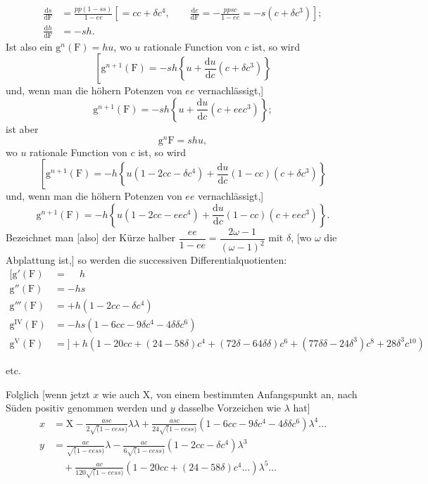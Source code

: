 \[
\begin{aligned}
\frac{\mathrm ds}{\mathrm d\mathrm F}
 &=\frac{pp(1-ss)}{1-ee}\left[=cc+\delta c^4,\qquad
 \frac{\mathrm dc}{\mathrm d\mathrm F}=-\frac{ppsc}{1-ee}=-s(c+\delta c^3)\right];\\
\frac{\mathrm dh}{\mathrm d\mathrm F}&=-sh.
\end{aligned}
\]
Ist also ein \(\mathrm g^n(\mathrm F)=hu\), wo \(u\) rationale Function von \(c\) ist, so wird
\[
\left[\mathrm g^{n+1}(\mathrm F)=-sh\left\{u+\frac{\mathrm du}{\mathrm dc}(c+\delta c^3)\right\}\right.
\]
\noindent und, wenn man die höhern Potenzen von \(ee\) vernachlässigt,]
\[
\mathrm g^{n+1}(\mathrm F)=-sh\left\{u+\frac{\mathrm du}{\mathrm dc}(c+eec^3)\right\};
\]
\noindent ist aber
\[
\mathrm g^n\mathrm F=shu,
\]
\noindent wo \(u\) rationale Function von \(c\) ist, so wird
\[
\left[\mathrm g^{n+1}(\mathrm F)=-h\left\{u(1-2cc-\delta c^4)
 +\frac{\mathrm du}{\mathrm dc}(1-cc)(c+\delta c^3)\right\}\right.
\]
\noindent und, wenn man die höhern Potenzen von \(ee\) vernachlässigt,]
\[
\mathrm g^{n+1}(\mathrm F)=-h\left\{u(1-2cc-eec^4)
 +\frac{\mathrm du}{\mathrm dc}(1-cc)(c+eec^3)\right\}.
\]
Bezeichnet man [also] der Kürze halber
\(\dfrac{ee}{1-ee}=\dfrac{2\omega-1}{(\omega-1)^2}\) mit \(\delta\),
[wo \(\omega\) die Abplattung ist,] so werden die successiven Differentialquotienten:
\[
\begin{aligned}
\mathopen{[}\mathrm g'(\mathrm F)&=\phantom{+}h\\
\mathrm g''(\mathrm F)&=-hs\\
\mathrm g'''(\mathrm F)&=+h(1-2cc-\delta c^4)\\
\mathrm g^{\mathrm{IV}}(\mathrm F)&=-hs(1-6cc-9\delta c^4-4\delta\delta c^6)\\
\mathrm g^{\mathrm V}(\mathrm F)&={]}+h(1-20cc+(24-58\delta)c^4+(72\delta-64\delta\delta)c^6
 +(77\delta\delta-24\delta^3)c^8+28\delta^3c^{10})
\end{aligned}
\]
\centerline{etc.}
\medskip

Folglich [wenn jetzt \(x\) wie auch \(\mathrm X\), von einem bestimmten Anfangspunkt
an, nach Süden positiv genommen werden und \(y\) dasselbe Vorzeichen wie \(\lambda\) hat]
\[
\begin{aligned}
x&=\mathrm X-\frac{asc}{2\surd(1-eess)}\lambda\lambda
 +\frac{asc}{24\surd(1-eess)}(1-6cc-9\delta c^4-4\delta\delta c^6)\lambda^4\ldots\\
y&=\frac{ac}{\surd(1-eess)}\lambda
 -\frac{ac}{6\surd(1-eess)}(1-2cc-\delta c^4)\lambda^3\\
 &\quad+\frac{ac}{120\surd(1-eess)}(1-20cc+(24-58\delta)c^4\ldots)\lambda^5\ldots
\end{aligned}
\]

